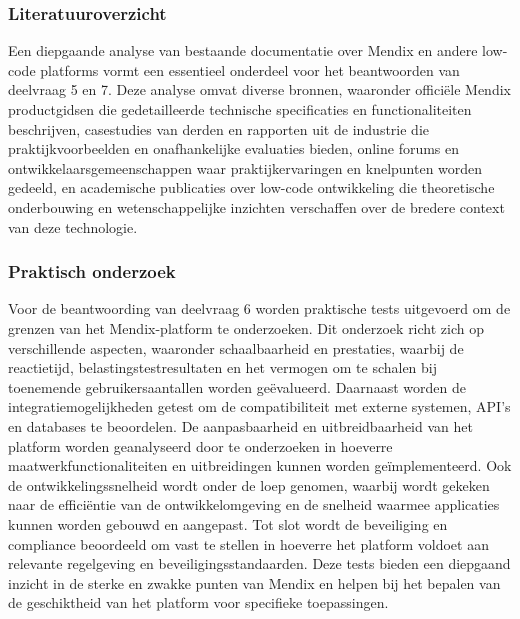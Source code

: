 \subsubsection{Literatuuroverzicht}
Een diepgaande analyse van bestaande documentatie over Mendix en andere low-code platforms vormt een essentieel onderdeel voor het beantwoorden van deelvraag 5 en 7. Deze analyse omvat diverse bronnen, waaronder officiële Mendix productgidsen die gedetailleerde technische specificaties en functionaliteiten beschrijven, casestudies van derden en rapporten uit de industrie die praktijkvoorbeelden en onafhankelijke evaluaties bieden, online forums en ontwikkelaarsgemeenschappen waar praktijkervaringen en knelpunten worden gedeeld, en academische publicaties over low-code ontwikkeling die theoretische onderbouwing en wetenschappelijke inzichten verschaffen over de bredere context van deze technologie.
\subsubsection{Praktisch onderzoek}
Voor de beantwoording van deelvraag 6 worden praktische tests uitgevoerd om de grenzen van het Mendix-platform te onderzoeken. Dit onderzoek richt zich op verschillende aspecten, waaronder schaalbaarheid en prestaties, waarbij de reactietijd, belastingstestresultaten en het vermogen om te schalen bij toenemende gebruikersaantallen worden geëvalueerd. Daarnaast worden de integratiemogelijkheden getest om de compatibiliteit met externe systemen, API’s en databases te beoordelen. De aanpasbaarheid en uitbreidbaarheid van het platform worden geanalyseerd door te onderzoeken in hoeverre maatwerkfunctionaliteiten en uitbreidingen kunnen worden geïmplementeerd. Ook de ontwikkelingssnelheid wordt onder de loep genomen, waarbij wordt gekeken naar de efficiëntie van de ontwikkelomgeving en de snelheid waarmee applicaties kunnen worden gebouwd en aangepast. Tot slot wordt de beveiliging en compliance beoordeeld om vast te stellen in hoeverre het platform voldoet aan relevante regelgeving en beveiligingsstandaarden. Deze tests bieden een diepgaand inzicht in de sterke en zwakke punten van Mendix en helpen bij het bepalen van de geschiktheid van het platform voor specifieke toepassingen.

